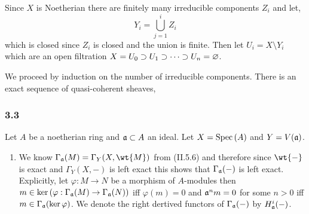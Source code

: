 \documentclass[12pt]{article}
\begin{document}
Since $X$ is Noetherian there are finitely many irreducible components $Z_i$ and let,
\[ Y_i = \bigcup_{j = 1}^i Z_i \]
which is closed since $Z_i$ is closed and the union is finite. Then let $U_i = X \setminus Y_i$ which are an open filtration $X = U_0 \supset U_1 \supset \cdots \supset U_{n} = \varnothing$.

We proceed by induction on the number of irreducible components. There is an exact sequence of quasi-coherent sheaves,

\subsubsection{3.3}

Let $A$ be a noetherian ring and $\mathfrak{a} \subset A$ an ideal. Let $X = \mathrm{Spec}\left( A \right)$ and $Y = V(\mathfrak{a})$.  

\begin{enumerate}
\item We know $\Gamma_\a(M) = \Gamma_Y(X, \wt{M})$ from (II.5.6) and therefore since $\wt{-}$ is exact and $\Gamma_Y(X, -)$ is left exact this shows that $\Gamma_{\mathfrak{a}}(-)$ is left exact. Explicitly, let $\varphi : M \to N$ be a morphism of $A$-modules then $m \in \ker{(\varphi : \Gamma_{\mathfrak{a}}(M) \to \Gamma_{\mathfrak{a}}(N))}$ iff $\varphi(m) = 0$ and $\mathfrak{a}^n m = 0$ for some $n > 0$ iff $m \in \Gamma_{\mathfrak{a}}(\ker{\varphi})$. We denote the right dertived functors of $\Gamma_{\mathfrak{a}}(-)$ by $H_{\mathfrak{a}}^i(-)$.


\end{enumerate}
\end{document}
